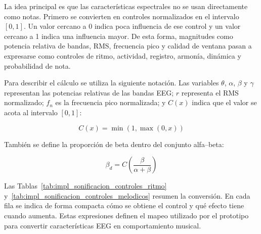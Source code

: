\documentclass[../main.tex]{subfiles}
\begin{document}
La idea principal es que las características espectrales no se usan directamente como notas. Primero se convierten en controles normalizados en el intervalo \([0,1]\). Un valor cercano a 0 indica poca influencia de ese control y un valor cercano a 1 indica una influencia mayor. De esta forma, magnitudes como potencia relativa de bandas, RMS, frecuencia pico y calidad de ventana pasan a expresarse como controles de ritmo, actividad, registro, armonía, dinámica y probabilidad de nota.

Para describir el cálculo se utiliza la siguiente notación. Las variables \(\theta\), \(\alpha\), \(\beta\) y \(\gamma\) representan las potencias relativas de las bandas EEG; \(r\) representa el RMS normalizado; \(f_n\) es la frecuencia pico normalizada; y \(C(x)\) indica que el valor se acota al intervalo \([0,1]\):

\[
    C(x)=\min(1,\max(0,x))
\]

También se define la proporción de beta dentro del conjunto alfa--beta:

\[
    \beta_d = C\left(\frac{\beta}{\alpha+\beta}\right)
\]

Las Tablas~\ref{tab:impl_sonificacion_controles_ritmo} y~\ref{tab:impl_sonificacion_controles_melodicos} resumen la conversión. En cada fila se indica de forma compacta cómo se obtiene el control y qué efecto tiene cuando aumenta. Estas expresiones definen el mapeo utilizado por el prototipo para convertir características EEG en comportamiento musical.
\end{document}
